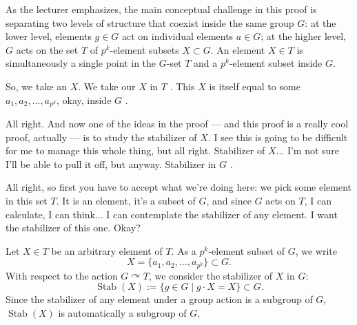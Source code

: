 \begin{proofWrapper}
\begin{insight}
As the lecturer emphasizes, the main conceptual challenge in this proof is separating two levels of structure that coexist inside the same group $G$: at the lower level, elements $g \in G$ act on individual elements $a \in G$; at the higher level, $G$ acts on the set $T$ of $p^k$-element subsets $X \subset G$. An element $X \in T$ is simultaneously a single point in the $G$-set $T$ and a $p^k$-element subset inside $G$.
\end{insight}

\begin{hidden}
\end{hidden}

\begin{speech}[00:06:39 - 00:07:47]
So, we take an $X$. We take our $X$ in $T$ . This $X$ is itself equal to some $a_1, a_2, \dots, a_{p^k}$, okay, inside $G$ .

All right. And now one of the ideas in the proof --- and this proof is a really cool proof, actually --- is to study the stabilizer of $X$. I see this is going to be difficult for me to manage this whole thing, but all right. Stabilizer of $X$... I'm not sure I'll be able to pull it off, but anyway. Stabilizer in $G$ .

All right, so first you have to accept what we're doing here: we pick some element in this set $T$. It is an element, it's a subset of $G$, and since $G$ acts on $T$, I can calculate, I can think... I can contemplate the stabilizer of any element. I want the stabilizer of this one. Okay?
\end{speech}

\begin{content}
Let $X \in T$ be an arbitrary element of $T$. As a $p^k$-element subset of $G$, we write
\[
X = \{a_1, a_2, \dots, a_{p^k}\} \subset G.
\]
With respect to the action $G \curvearrowright T$, we consider the stabilizer of $X$ in $G$:
\[
\operatorname{Stab}(X) := \{ g \in G \mid g \cdot X = X \} \subset G.
\]
Since the stabilizer of any element under a group action is a subgroup of $G$, $\operatorname{Stab}(X)$ is automatically a subgroup of $G$.
\end{content}


\end{proofWrapper}
